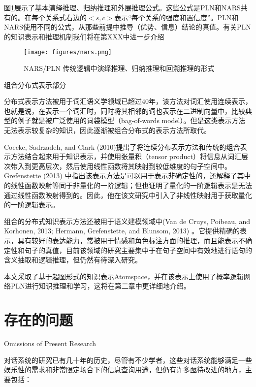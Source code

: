      图\ref{fig:nars}展示了基本演绎推理、归纳推理和外展推理公式。这些公式是PLN和NARS共有的。在每个关系式右边的$<s,c>$表示“每个关系的强度和置信度”。PLN和NARS使用不同的公式，从那些前提中推导（优势、信息）结论的真值。有关PLN的知识表示和推理机制我们将在第XXX中进一步介绍

\begin{figure}[htb]
\centering
\texttt{[image: figures/nars.png]}
\caption{ NARS/PLN 传统逻辑中演绎推理、归纳推理和回溯推理的形式 }
\label{fig:nars}
\end{figure}
 

组合分布式表示部分

      分布式表示方法被用于词汇语义学领域已超过40年\cite{Jurafsky2008}，该方法对词汇使用连续表示，也就是说，在表示一个词汇时，同时将其相邻的词也表示在二进制向量中，比较典型的例子就是被广泛使用的词袋模型（bag-of-words model）。但是这类表示方法无法表示较复杂的知识，因此逐渐被组合分布式的表示方法所取代。

      Coecke, Sadrzadeh, and Clark (2010)提出了将连续分布表示方法和传统的组合表示方法结合起来用于知识表示，并使用张量积（tensor product）将信息从词汇层次带入到更高层次，然后使用线性函数将其映射到较低维度的句子空间中。Grefenstette (2013) 中指出该表示方法是可以用于表示非确定性的，还解释了其中的线性函数映射等同于非量化的一阶逻辑；但也证明了量化的一阶逻辑表示是无法通过线性函数映射得到的。因此，他在该文研究中引入了非线性映射用于获取量化的一阶逻辑表示。


组合的分布式知识表示方法还被用于语义建模领域中(Van de Cruys, Poibeau, and Korhonen, 2013; Hermann, Grefenstette, and Blunsom, 2013) 。它提供精确的表示，具有较好的表达能力，常被用于情感和角色标注方面的推理，而且能表示不确定性和句子的真值，目前该领域的研究主要集中于在句子空间中有效地进行语句的含义抽取和逻辑推理，但仍然有待深入研究。

   本文采取了基于超图形式的知识表示Atomspace，并在该表示上使用了概率逻辑网络PLN进行知识推理和学习，这将在第二章中更详细地介绍。




\section{存在的问题}{Omissions of Present Research}

对话系统的研究已有几十年的历史，尽管有不少学者，这些对话系统能够满足一些娱乐性的需求和非常限定场合下的信息查询用途，但仍有许多亟待改进的地方，主要包括：

